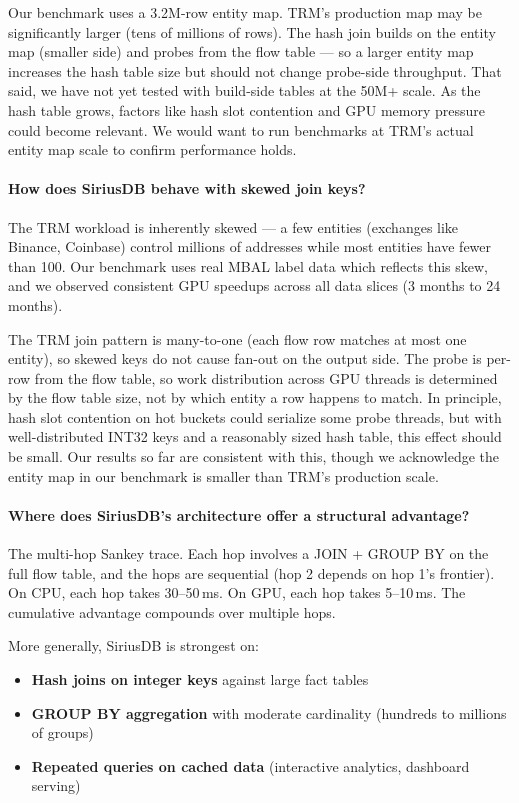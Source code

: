 \documentclass[11pt,a4paper]{article}
\begin{document}
Our benchmark uses a 3.2M-row entity map. TRM's production map may be
significantly larger (tens of millions of rows). The hash join builds on the
entity map (smaller side) and probes from the flow table --- so a larger entity
map increases the hash table size but should not change probe-side throughput.
That said, we have not yet tested with build-side tables at the 50M+ scale. As
the hash table grows, factors like hash slot contention and GPU memory pressure
could become relevant. We would want to run benchmarks at TRM's actual entity
map scale to confirm performance holds.

\paragraph{How does SiriusDB behave with skewed join keys?}

The TRM workload is inherently skewed --- a few entities (exchanges like
Binance, Coinbase) control millions of addresses while most entities have fewer
than 100. Our benchmark uses real MBAL label data which reflects this skew, and
we observed consistent GPU speedups across all data slices (3 months to 24
months).

The TRM join pattern is many-to-one (each flow row matches at most one entity),
so skewed keys do not cause fan-out on the output side. The probe is per-row
from the flow table, so work distribution across GPU threads is determined by
the flow table size, not by which entity a row happens to match. In principle,
hash slot contention on hot buckets could serialize some probe threads, but with
well-distributed INT32 keys and a reasonably sized hash table, this effect
should be small. Our results so far are consistent with this, though we
acknowledge the entity map in our benchmark is smaller than TRM's production
scale.

\paragraph{Where does SiriusDB's architecture offer a structural advantage?}

The multi-hop Sankey trace. Each hop involves a JOIN + GROUP BY on the full flow
table, and the hops are sequential (hop 2 depends on hop 1's frontier). On CPU,
each hop takes 30--50\,ms. On GPU, each hop takes 5--10\,ms. The cumulative
advantage compounds over multiple hops.

\medskip\noindent More generally, SiriusDB is strongest on:
\begin{itemize}[nosep]
    \item \textbf{Hash joins on integer keys} against large fact tables
    \item \textbf{GROUP BY aggregation} with moderate cardinality (hundreds to millions of groups)
    \item \textbf{Repeated queries on cached data} (interactive analytics, dashboard serving)
\end{itemize}
\end{document}
